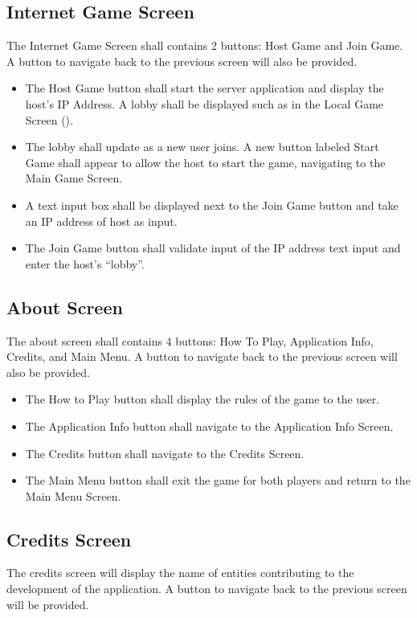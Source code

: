 \subsection{Internet Game Screen}
The Internet Game Screen shall contains 2 buttons: Host Game and Join Game.  A
button to navigate back to the previous screen will also be provided.
\begin{itemize}
  \item
    The Host Game button shall start the server application and display the
    host's IP Address. A lobby shall be displayed such as in the Local Game
    Screen ().
  \item
    The lobby shall update as a new user joins. A new button labeled Start Game
    shall appear to allow the host to start the game, navigating to the Main
    Game Screen.
  \item
    A text input box shall be displayed next to the Join Game button and take
    an IP address of host as input.
  \item
    The Join Game button shall validate input of the IP address text input and
    enter the host's ``lobby''.
\end{itemize}

\subsection{About Screen}
The about screen shall contains 4 buttons: How To Play, Application Info,
Credits, and Main Menu. A button to navigate back to the previous screen will
also be provided.

\begin{itemize}
  \item The How to Play button shall display the rules of the game to the user.
  \item The Application Info button shall navigate to the Application Info
    Screen.
  \item The Credits button shall navigate to the Credits Screen.
  \item The Main Menu button shall exit the game for both players and return to
    the Main Menu Screen.
\end{itemize}

\subsection{Credits Screen}
The credits screen will display the name of entities contributing to the
development of the application. A button to navigate back to the previous
screen will be provided.


